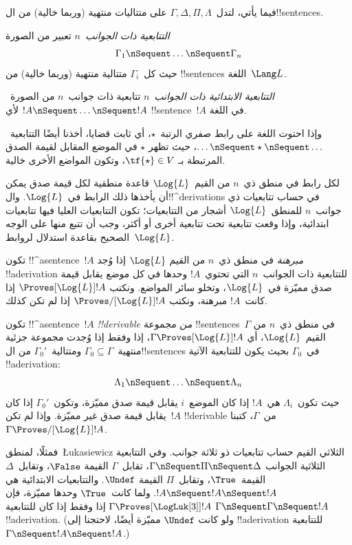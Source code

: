 \documentclass[../../../include/open-logic-section]{subfiles}
\begin{document}


فيما يأتي، لتدل~$\Gamma, \Delta, \Pi, \Lambda$ على متتاليات منتهية
(وربما خالية) من ال!!{sentence}s.

\begin{defn}[التتابعية]
\emph{التتابعية ذات الجوانب~$n$} تعبير من الصورة
\[
\Gamma_1 \nSequent \dots \nSequent \Gamma_n
\]
حيث كل~$\Gamma_i$ متتالية منتهية (وربما خالية) من !!{sentence}s
اللغة~$\Lang L$.
\end{defn}

\begin{defn}
\emph{التتابعية الابتدائية ذات الجوانب~$n$} تتابعية ذات جوانب~$n$ من
الصورة~$!A \nSequent \dots \nSequent !A$ لأي !!{sentence}~$!A$ في
اللغة.

وإذا احتوت اللغة على رابط صفري الرتبة~$\star$، أي ثابت قضايا، أخذنا
أيضًا التتابعية~$\dots \nSequent \star \nSequent \dots$، حيث تظهر
$\star$ في الموضع المقابل لقيمة الصدق المرتبطة بـ
$\tf{\star} \in V$، وتكون المواضع الأخرى خالية.
\end{defn}

لكل رابط في منطق ذي~$n$ من القيم~$\Log{L}$ قاعدة منطقية لكل قيمة صدق
يمكن أن يأخذها ذلك الرابط في~$\Log{L}$. وال!!^{derivation}s في حساب
تتابعيات ذي جوانب~$n$ للمنطق~$\Log{L}$ أشجار من التتابعيات؛ تكون
التتابعيات العليا فيها تتابعيات ابتدائية، وإذا وقعت تتابعية تحت
تتابعية أخرى أو أكثر، وجب أن تتبع منها على الوجه الصحيح بقاعدة
استدلال لروابط~$\Log{L}$.

\begin{defn}[المبرهنات]
تكون !!^a{sentence}~$!A$ \emph{مبرهنة} في منطق ذي~$n$ من القيم
$\Log{L}$ إذا وُجد !!a{derivation} للتتابعية ذات الجوانب~$n$ التي
تحتوي~$!A$ وحدها في كل موضع يقابل قيمة صدق مميّزة في~$\Log{L}$،
وتخلو سائر المواضع. ونكتب
$\Proves[\Log{L}] !A$ إذا كانت~$!A$ مبرهنة، ونكتب
$\Proves/[\Log{L}] !A$ إذا لم تكن كذلك.
\end{defn}

\begin{defn}[!!^{derivability}]
تكون !!^a{sentence}~$!A$ \emph{!!{derivable} من} مجموعة
!!{sentence}s~$\Gamma$ في منطق ذي~$n$ من القيم~$\Log{L}$، أي
$\Gamma \Proves[\Log{L}] !A$، إذا وفقط إذا وُجدت مجموعة جزئية
منتهية~$\Gamma_0 \subseteq \Gamma$ ومتتالية~$\Gamma_0'$ من
ال!!{sentence}s في~$\Gamma_0$ بحيث يكون للتتابعية الآتية
!!a{derivation}:
\[ \Lambda_1 \nSequent \dots \nSequent \Lambda_n \]
حيث تكون~$\Lambda_i$ هي~$!A$ إذا كان الموضع~$i$ يقابل قيمة صدق
مميّزة، وتكون~$\Gamma_0'$ إذا كان يقابل قيمة صدق غير مميّزة. وإذا لم
تكن~$!A$ !!{derivable} من~$\Gamma$، كتبنا
$\Gamma \Proves/[\Log{L}] !A$.
\end{defn}

فمثلًا، لمنطق~\L ukasiewicz الثلاثي القيم حساب تتابعيات ذو ثلاثة
جوانب. وفي التتابعية الثلاثية الجوانب
$\Gamma \nSequent \Pi \nSequent \Delta$، تقابل~$\Gamma$ القيمة
$\False$، وتقابل~$\Delta$ القيمة~$\True$، وتقابل~$\Pi$ القيمة
$\Undef$. والتتابعيات الابتدائية هي
$!A \nSequent !A \nSequent !A$. ولما كانت~$\True$ وحدها مميّزة، فإن
$\Gamma \Proves[\LogLuk[3]] !A$ إذا وفقط إذا كان للتتابعية
$\Gamma \nSequent \Gamma \nSequent !A$ !!a{derivation}. (ولو كانت
$\Undef$ مميّزة أيضًا، لاحتجنا إلى !!a{derivation} للتتابعية
$\Gamma \nSequent !A \nSequent !A$.)
\end{document}
